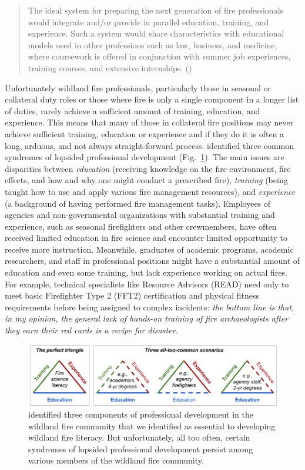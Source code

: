 \documentclass[fire,article,submit,moreauthors,pdftex]{Definitions/mdpi}
\begin{document}
\begin{quote}
The ideal system for preparing the next generation of fire professionals would integrate and/or provide in parallel education, training, and experience.
Such a system would share characteristics with educational models used in other professions such as law, business, and medicine, where coursework is offered in conjunction with summer job experiences, training courses, and extensive internships. (\citet[][p.~344]{kobziar2009})
\end{quote}

Unfortunately wildland fire professionals, particularly those in seasonal or collateral duty roles or those where fire is only a single component in a longer list of duties, rarely achieve a sufficient amount of training, education, and experience.
This means that many of those in collateral fire positions may never achieve sufficient training, education or experience and if they do it is often a long, arduous, and not always straight-forward process.
\citet{kobziar2009} identified three common syndromes of lopsided professional development (Fig.~\ref{FireTrainingTriangles}).
The main issues are disparities between \emph{education} (receiving knowledge on the fire environment, fire effects, and how and why one might conduct a prescribed fire), \emph{training} (being taught how to use and apply various fire management resources), and \emph{experience} (a background of having performed fire management tasks).
Employees of agencies and non-governmental organizations with substantial training and experience, such as seasonal firefighters and other crewmembers, have often received limited education in fire science and encounter limited opportunity to receive more instruction.
Meanwhile, graduates of academic programs, academic researchers, and staff in professional positions might have a substantial amount of education and even some training, but lack experience working on actual fires.
For example, technical specialists like Resource Advisors (READ) need only to meet basic Firefighter Type 2 (FFT2) certification and physical fitness requirements before being assigned to complex incidents: \emph{the bottom line is that, in my opinion, the general lack of hands-on training of fire archaeologists after they earn their red cards is a recipe for disaster.} \citep[p.~3]{hangan2010}

\begin{figure}
\centering
\includegraphics[width=1\columnwidth]{FireTrainingTriangles.png}
\caption{\citet{kobziar2009} identified three components of professional development in the wildland fire community that we identified as essential to developing wildland fire literacy. But unfortunately, all too often, certain syndromes of lopsided professional development persist among various members of the wildland fire community. \label{FireTrainingTriangles}}
\end{figure}
\end{document}
